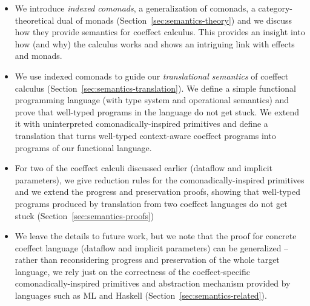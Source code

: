 \begin{itemize}
\item We introduce \emph{indexed comonads}, a generalization of comonads, a category-theoretical 
  dual of monads (Section~\ref{sec:semantics-theory}) and we discuss how they provide semantics
  for coeffect calculus. This provides an insight into how (and why) the calculus works and shows 
  an intriguing link with effects and monads.
  
\item We use indexed comonads to guide our \emph{translational semantics} of coeffect calculus
  (Section~\ref{sec:semantics-translation}). We define a simple functional programming language
  (with type system and operational semantics) and prove that well-typed programs in the language
  do not get stuck. We extend it with uninterpreted comonadically-inspired primitives and
  define a translation that turns well-typed context-aware coeffect programs into programs of 
  our functional language.
  
\item For two of the coeffect calculi discussed earlier (dataflow and implicit parameters),
  we give reduction rules for the comonadically-inspired primitives and we extend the progress
  and preservation proofs, showing that well-typed programs produced by translation from two
  coeffect languages do not get stuck (Section~\ref{sec:semantics-proofs})

\item We leave the details to future work, but we note that the proof for concrete coeffect language 
  (dataflow and implicit parameters) can be generalized -- rather than reconsidering progress and 
  preservation of the whole target language, we rely just on the correctness of the coeffect-specific 
  comonadically-inspired primitives and abstraction mechanism provided by languages 
  such as ML and Haskell (Section~\ref{sec:semantics-related}).
\end{itemize}  


%
%

